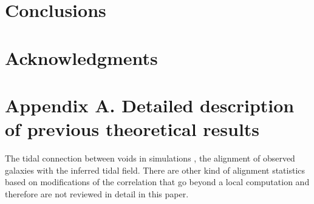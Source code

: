 \documentclass[usenatbib]{mn2e}
\begin{document}
\section{Conclusions}
\label{sec:conclusions}


\section*{Acknowledgments} 

\section*{Appendix A. Detailed description of previous theoretical results}


The tidal connection between voids in simulations \citep{Platen2008},
the alignment of observed galaxies with the inferred tidal
field\citep{Lee2007,Jones2010}. There are other kind of alignment
statistics based on modifications of the correlation
\citep{Paz2008,Faltenbacher2009} that go beyond a local computation
and therefore are not reviewed in detail in this paper.
\end{document}
